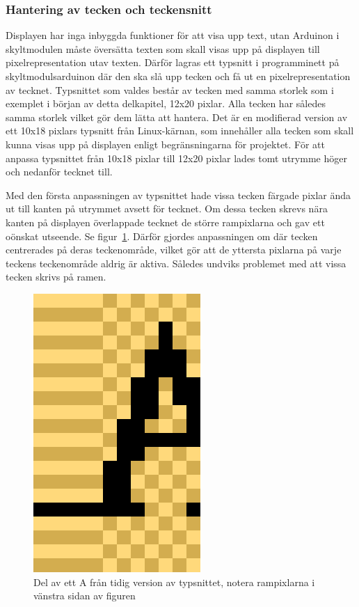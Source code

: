 \documentclass[a4paper,11pt]{article}
\begin{document}
\subsubsection{Hantering av tecken och teckensnitt}

Displayen har inga inbyggda funktioner för att visa upp text, utan Arduinon i skyltmodulen måste översätta texten som skall visas upp på displayen till pixelrepresentation utav texten. Därför lagras ett typsnitt i programminett på skyltmodulsarduinon där den ska slå upp tecken och få ut en pixelrepresentation av tecknet. Typsnittet som valdes består av tecken med samma storlek som i exemplet i början av detta delkapitel, 12x20 pixlar. Alla tecken har således samma storlek vilket gör dem lätta att hantera. Det är en modifierad version av ett 10x18 pixlars typsnitt från Linux-kärnan, som innehåller alla tecken som skall kunna visas upp på displayen enligt begränsningarna för projektet. För att anpassa typsnittet från 10x18 pixlar till 12x20 pixlar lades tomt utrymme höger och nedanför tecknet till.

Med den första anpassningen av typsnittet hade vissa tecken färgade pixlar ända ut till kanten på utrymmet avsett för tecknet. Om dessa tecken skrevs nära kanten på displayen överlappade tecknet de större rampixlarna och gav ett oönskat utseende. Se figur~\ref{fig:fontA}. Därför gjordes anpassningen om där tecken centrerades på deras teckenområde, vilket gör att de yttersta pixlarna på varje teckens teckenområde aldrig är aktiva. Således undviks problemet med att vissa tecken skrivs på ramen.

\begin{figure}[H]
\begin{center}
\includegraphics[scale=0.5, angle=0]{fontA.png}
\end{center}
\caption{Del av ett A från tidig version av typsnittet, notera rampixlarna i vänstra sidan av figuren}
\label{fig:fontA}
\end{figure}
\end{document}
